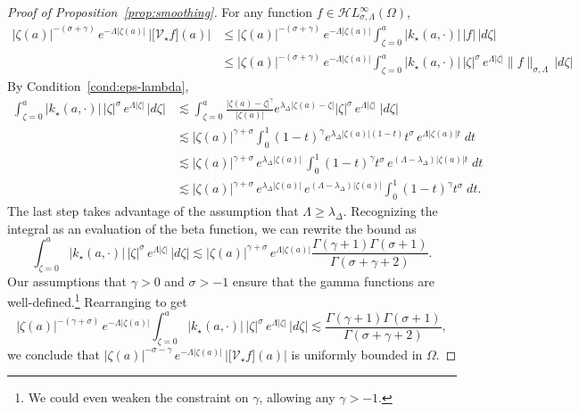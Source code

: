 \documentclass{article}
\theoremstyle{plain}
\newcommand{\singexp}[2]{\mathcal{H}L^\infty_{#1, #2}}
\newcommand{\softpart}{\mathcal{V}_\star}
\newcommand{\softker}{k_\star}
\newcommand{\domain}{\Omega}
\begin{document}
\begin{proof}[Proof of Proposition~\ref{prop:smoothing}]
For any function $f\in\singexp{\sigma}{\Lambda}(\domain)$,
\begin{align*}
|\zeta(a)|^{-(\sigma+\gamma)} \, e^{-\Lambda |\zeta(a)|} \, \Big \vert \big[ \softpart f\big](a)\Big\vert
&\leq |\zeta(a)|^{-(\sigma+\gamma)}\, e^{-\Lambda |\zeta(a)|} \int_{\zeta=0}^a |\softker(a,\cdot)|\, |f| \, |d\zeta| \\
&\leq |\zeta(a)|^{-(\sigma+\gamma)}\, e^{-\Lambda |\zeta(a)|} \int_{\zeta=0}^a |\softker(a,\cdot)|\, |\zeta|^{\sigma}\, e^{\Lambda |\zeta|} \|f\|_{\sigma,\Lambda} \, |d\zeta| 
\end{align*}
By Condition~\eqref{cond:eps-lambda},
\begin{align*}
\int_{\zeta=0}^a |\softker(a,\cdot)|\, |\zeta|^{\sigma}\, e^{\Lambda |\zeta|} \, |d\zeta| &\lesssim \int_{\zeta=0}^a \frac{|\zeta(a)-\zeta|^\gamma}{|\zeta(a)|} e^{\lambda_\Delta |\zeta(a)-\zeta|} |\zeta|^{\sigma}\, e^{\Lambda|\zeta|}\;|d\zeta|\\
&\lesssim |\zeta(a)|^{\gamma+\sigma} \int_{0}^1 (1-t)^\gamma e^{\lambda_\Delta |\zeta(a)|(1-t)} t^{\sigma}\, e^{\Lambda|\zeta(a)| t}\;dt\\
&\lesssim |\zeta(a)|^{\gamma+\sigma}\, e^{\lambda_\Delta |\zeta(a)|}\,  \int_{0}^1 (1-t)^\gamma  t^{\sigma}\,e^{(\Lambda-\lambda_\Delta)|\zeta(a)| t}\;dt\\
&\lesssim |\zeta(a)|^{\gamma+\sigma}\, e^{\lambda_\Delta |\zeta(a)|}\,e^{(\Lambda-\lambda_\Delta)|\zeta(a)|}\int_{0}^1 (1-t)^\gamma  t^{\sigma}\;dt.
\end{align*}
The last step takes advantage of the assumption that $\Lambda \ge \lambda_\Delta$. Recognizing the integral as an evaluation of the beta function, we can rewrite the bound as
\[ \int_{\zeta=0}^a |\softker(a,\cdot)|\, |\zeta|^{\sigma}\, e^{\Lambda |\zeta|} \, |d\zeta| \lesssim |\zeta(a)|^{\gamma+\sigma}\, e^{\Lambda |\zeta(a)|} \frac{\Gamma(\gamma+1)\Gamma(\sigma+1)}{\Gamma(\sigma+\gamma+2)}. \]
Our assumptions that $\gamma > 0$ and $\sigma > -1$ ensure that the gamma functions are well-defined.\footnote{We could even weaken the constraint on $\gamma$, allowing any $\gamma > -1$.} Rearranging to get
\[ |\zeta(a)|^{-(\gamma+\sigma)}\, e^{-\Lambda |\zeta(a)|} \int_{\zeta=0}^a |\softker(a,\cdot)|\, |\zeta|^{\sigma}\, e^{\Lambda |\zeta|} \, |d\zeta| \lesssim \frac{\Gamma(\gamma+1)\Gamma(\sigma+1)}{\Gamma(\sigma+\gamma+2)}, \]
we conclude that $|\zeta(a)|^{-\sigma-\gamma} \, e^{-\Lambda |\zeta(a)|} \, \Big \vert \big[ \softpart f\big](a)\Big\vert$ is uniformly bounded in $\domain$. 
\end{proof}
\end{document}
